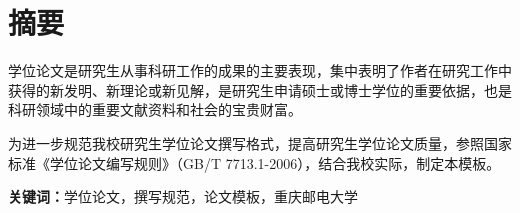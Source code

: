 


\chapter{摘\quad 要}
\xiaosi

学位论文是研究生从事科研工作的成果的主要表现，集中表明了作者在研究工作中获得的新发明、新理论或新见解，是研究生申请硕士或博士学位的重要依据，也是科研领域中的重要文献资料和社会的宝贵财富。

为进一步规范我校研究生学位论文撰写格式，提高研究生学位论文质量，参照国家标准《学位论文编写规则》（GB/T 7713.1-2006），结合我校实际，制定本模板。

  
\noindent\songti\textbf{关键词：}学位论文，撰写规范，论文模板，重庆邮电大学

\clearpage